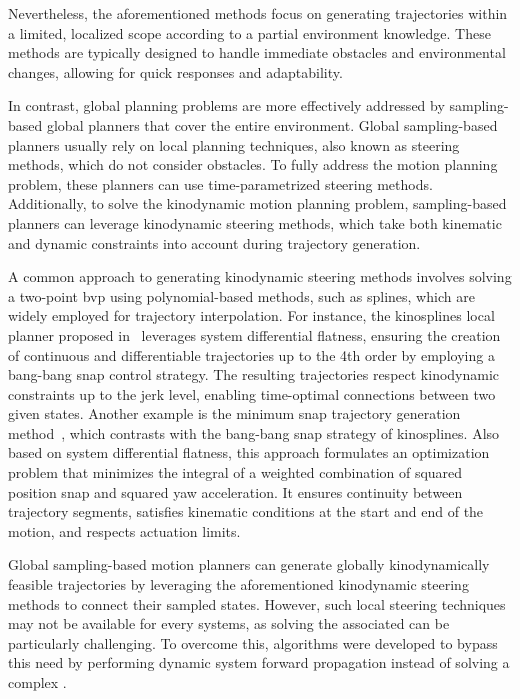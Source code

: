 Nevertheless, the aforementioned methods focus on generating trajectories within a limited, localized scope according to a partial environment knowledge. 
These methods are typically designed to handle immediate obstacles and environmental changes, allowing for quick responses and adaptability.

In contrast, global planning problems are more effectively addressed by sampling-based global planners that cover the entire environment.
Global sampling-based planners usually rely on local planning techniques, also known as steering methods, which do not consider obstacles. 
To fully address the motion planning problem, these planners can use time-parametrized steering methods. 
Additionally, to solve the kinodynamic motion planning problem, sampling-based planners can leverage kinodynamic steering methods, which take both kinematic and dynamic constraints into account during trajectory generation.

A common approach to generating kinodynamic steering methods involves solving a two-point \gls{bvp} using polynomial-based methods, such as splines, which are widely employed for trajectory interpolation. 
For instance, the kinosplines local planner proposed in~\cite{cKino} leverages system differential flatness, ensuring the creation of continuous and differentiable trajectories up to the 4th order by employing a bang-bang snap control strategy. 
The resulting trajectories respect kinodynamic constraints up to the jerk level, enabling time-optimal connections between two given states.
Another example is the minimum snap trajectory generation method~\cite{cMinimumSnap}, which contrasts with the bang-bang snap strategy of kinosplines. 
Also based on system differential flatness, this approach formulates an optimization problem that minimizes the integral of a weighted combination of squared position snap and squared yaw acceleration.
It ensures continuity between trajectory segments, satisfies kinematic conditions at the start and end of the motion, and respects actuation limits.

Global sampling-based motion planners can generate globally kinodynamically feasible trajectories by leveraging the aforementioned kinodynamic steering methods to connect their sampled states.
However, such local steering techniques may not be available for every systems, as solving the associated  can be particularly challenging. 
To overcome this, algorithms were developed to bypass this need by performing dynamic system forward propagation instead of solving a complex .

